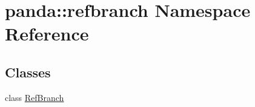 \hypertarget{namespacepanda_1_1refbranch}{
\section{panda::refbranch Namespace Reference}
\label{namespacepanda_1_1refbranch}
}
\subsection*{Classes}
\begin{DoxyCompactItemize}
\item 
class \hyperlink{classpanda_1_1refbranch_1_1RefBranch}{RefBranch}
\end{DoxyCompactItemize}
